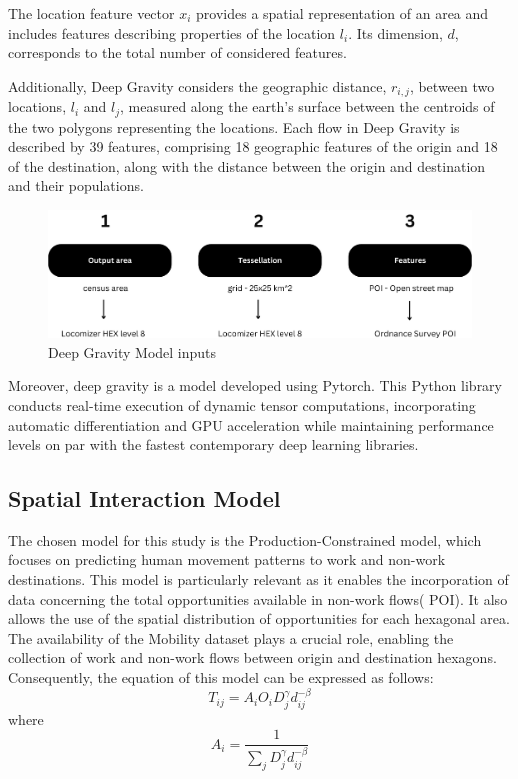 The location feature vector $x_i$ provides a spatial representation of an area and includes features describing properties of the location $l_i$. Its dimension, $d$, corresponds to the total number of considered features.

Additionally, Deep Gravity considers the geographic distance, $r_{i,j}$, between two locations, $l_i$ and $l_j$, measured along the earth's surface between the centroids of the two polygons representing the locations. Each flow in Deep Gravity is described by 39 features, comprising 18 geographic features of the origin and 18 of the destination, along with the distance between the origin and destination and their populations.

    \begin{figure}[H]
        \centering
        \includegraphics[width=14cm]{Images/DG_Input.png}
        \caption{Deep Gravity Model inputs}
        \label{fig: DG_input}
    \end{figure}

Moreover, deep gravity is a model developed using Pytorch. This Python library conducts real-time execution of dynamic tensor computations, incorporating automatic differentiation and GPU acceleration while maintaining performance levels on par with the fastest contemporary deep learning libraries\citep{paszkePyTorchImperativeStyle2019}.  
    

\subsection{Spatial Interaction Model}

The chosen model for this study is the Production-Constrained model, which focuses on predicting human movement patterns to work and non-work destinations. This model is particularly relevant as it enables the incorporation of data concerning the total opportunities available in non-work flows( POI). It also allows the use of the spatial distribution of opportunities for each hexagonal area. The availability of the Mobility dataset plays a crucial role, enabling the collection of work and non-work flows between origin and destination hexagons. Consequently, the equation of this model can be expressed as follows:
\begin{equation} \label{eq:1} \tag{1}
T_{ij} = A_i O_i D_j^\gamma d_{ij}^{-\beta}
\end{equation}
where
\begin{equation} \label{eq:3} \tag{2}
A_i = \frac{1}{\sum_j D_j^\gamma d_{ij}^{-\beta}}
\end{equation}

